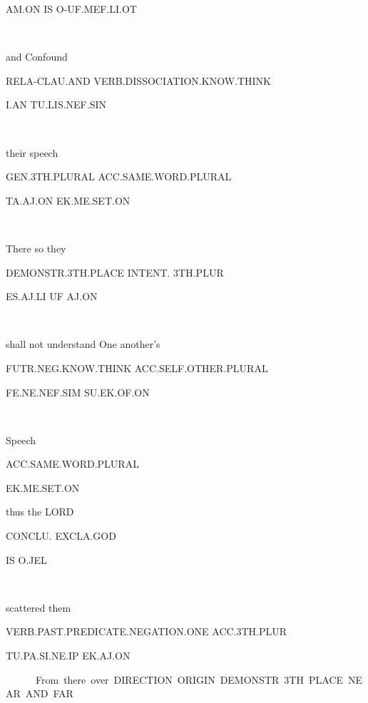 {{AM.ON	IS	 O-UF.MEF.LI.OT				 

\am\on~\is~\Atlano\uf\mef\li\ot
\drie
 

and  			Confound 

RELA-CLAU.AND	VERB.DISSOCIATION.KNOW.THINK 

I.AN			TU.LIS.NEF.SIN      

\Atlani\an~\tu\lis\nef\Atlansin
\drie

  

their 			speech

GEN.3TH.PLURAL             ACC.SAME.WORD.PLURAL	 	

TA.AJ.ON		EK.ME.SET.ON 

\ta\aj\on~\ek\me\set\on

\drie

  

There			so 			they 		

DEMONSTR.3TH.PLACE        INTENT.		3TH.PLUR	 

ES.AJ.LI				UF		AJ.ON				 

\es\aj\li~\uf~\aj\on

\drie


shall not understand 		One another’s 

FUTR.NEG.KNOW.THINK		ACC.SELF.OTHER.PLURAL 

FE.NE.NEF.SIM			SU.EK.OF.ON	 

\fe\Atlanne\nef\Atlansim~\su\ek\of\on
\drie

  

Speech 

ACC.SAME.WORD.PLURAL 

EK.ME.SET.ON 

\ek\me\set\on
\drie

 

thus 		the LORD 					

CONCLU.	EXCLA.GOD					 

IS		O.JEL		 

\is~\Atlano\jel 
\drie

 

scattered				them 

VERB.PAST.PREDICATE.NEGATION.ONE	ACC.3TH.PLUR 

TU.PA.SI.NE.IP				EK.AJ.ON 

\tu\pa\si\Atlanne\ip~\ek\aj\on
\drie

 

From 			there 			over 		

DIRECTION.ORIGIN         DEMONSTR.3TH.PLACE  NEAR.AND.FAR 

}}
